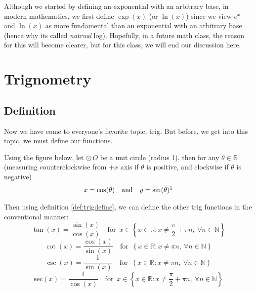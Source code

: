 \documentclass[11pt]{article}
\numberwithin{lemma}{section}
\numberwithin{equation}{section}
\numberwithin{define}{section}
\numberwithin{prop}{section}
\numberwithin{figure}{section}
\numberwithin{theorem}{section}
\numberwithin{cor}{section}
\newcounter{ex}[section]
\numberwithin{ex}{section}
\def\real{\mathbb{R}}
\def\nat{\mathbb{N}}
\def\cbrak#1{\left\{#1\right\}}
\def\jand{\quad\text{and}\quad}
\def\for{\quad\text{for }\,}
\begin{document}
Although we started by defining an exponential with an arbitrary base, in modern mathematics, we first define $\exp(x)$ (or $\ln(x)$) since we view $e^x$ and $\ln(x)$ as more fundamental than an exponential with an arbitrary base (hence why its called \textit{natrual} log). Hopefully, in a future math class, the reason for this will become clearer, but for this class, we will end our discussion here.

\section{Trignometry}
\subsection{Definition}
 Now we have come to everyone's favorite topic, trig. But before, we get into this topic, we must define our functions.
 	\begin{define}
 		\label{def:trigdefine}
		Using the figure below, let $\odot\,O$ be a unit circle (radius 1), then for any $\theta\in\real$ (measuring counterclockwise from $+x$ axis if $\theta$ is positive, and clockwise if $\theta$ is negative)
		$$x=\cos(\theta) \jand y=\sin(\theta)\footnotemark$$
		\begin{center}
	\end{center}
\end{define}


Then using definition \eqref{def:trigdefine}, we can define the other trig functions in the conventional manner:
$$\tan(x)=\frac{\sin(x)}{\cos(x)}
\for x\in \cbrak{x\in\real: x\neq \frac{\pi}{2}+\pi n, \:
\forall n\in\nat}$$
$$\cot(x)=\frac{\cos(x)}{\sin(x)}
\for \cbrak{x\in\real :x\neq\pi n, \:
\forall n\in\nat}$$
$$\csc(x)=\frac{1}{\sin(x)} \for \cbrak{x\in\real :x\neq\pi n, \:
\forall n\in\nat}$$
$$\text{sec}(x)=\frac{1}{\cos(x)}
\for x\in \cbrak{x\in\real: x\neq \frac{\pi}{2}+\pi n, \:
\forall n\in\nat}$$
\end{document}
